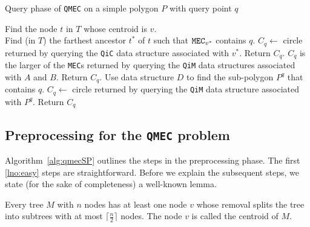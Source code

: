 \documentclass[12pt]{llncs}
\begin{document}
\begin{algorithm}[h!]
\caption{Query phase of {\tt QMEC} on a simple polygon $P$ with query point $q$}
\label{alg:QMECquery}
\begin{algorithmic}[1]

\STATE {}
\STATE Find the node $t$ in $T$ whose centroid is $v$.\\
\STATE Find (in $T$) the farthest ancestor $t^*$ of $t$  such that ${\tt MEC}_{v^*}$ 
contains $q$.
\STATE $C_q \leftarrow $ circle returned by querying the {\tt QiC} data structure 
associated with $v^*$. 
\STATE Return $C_q$. 
\ELSE
\STATE {}
\STATE {}
\STATE $C_q$ is the larger of the {\tt MEC}s returned by querying the {\tt QiM} data 
structures associated with $A$ and $B$.
\STATE Return $C_q$.
\ELSE 
\STATE Use data structure $D$ to find the sub-polygon $P^q$ that contains $q$.
\STATE $C_q \leftarrow $ circle returned by querying the {\tt QiM} data structure 
associated with $P^q$.
\STATE Return $C_q$
\ENDIF
\ENDIF
\end{algorithmic}
\end{algorithm}

\vspace{-0.2in}
\subsection{Preprocessing for the {\tt QMEC} problem} \label{preprocessing}

Algorithm\ \ref{alg:qmecSP} outlines the steps in the preprocessing phase. The first 
\ref{lno:easy} steps are straightforward. Before we explain the subsequent steps, we 
state (for the sake of completeness) a well-known lemma.
\begin{lemma} \label{Jordon} \cite{jordon}
Every tree $M$ with $n$ nodes has at least one node $v$ whose 
removal splits the tree into subtrees with at most 
$\lceil\frac{n}{2}\rceil$ nodes. The node $v$ is called the 
centroid of $M$.
\end{lemma}
\end{document}
